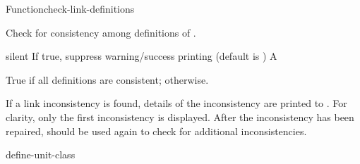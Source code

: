\documentclass[10pt,twoside,english,pdftex]{article}
\begin{document}
\begin{functiondoc}{Function}{check-link-definitions}{
    \returns{} }
%

\fnsyntax

\fnpurpose Check for consistency among  definitions of
.

\fnpackage {}

\fnmodule {}

\fnargs
\begin{args}{silent}
\arg[silent] If true, suppress warning/success printing (default is \nil) 
\arg[boolean] A 
\end{args}

\fnreturns True if all  definitions are consistent; \nil{}
otherwise. 

\fndescription If a link inconsistency is found, details of the inconsistency
are printed to .  For clarity, only the first
inconsistency is displayed.  After the inconsistency has been repaired,
 should be used again to check for
additional inconsistencies.

\begin{alsos}{define-unit-class}
\end{alsos}


\end{functiondoc}
\end{document}
